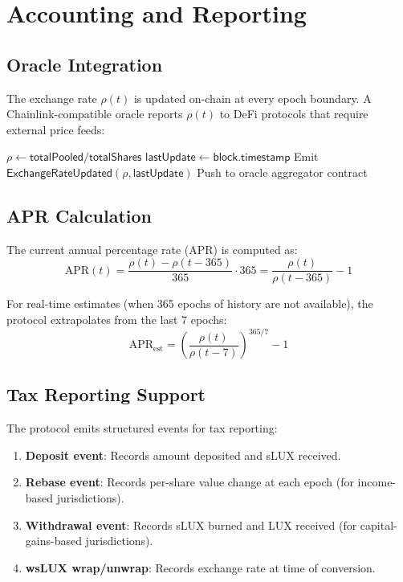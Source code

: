 \section{Accounting and Reporting}
\label{sec:accounting}

\subsection{Oracle Integration}

The exchange rate $\rho(t)$ is updated on-chain at every epoch boundary. A Chainlink-compatible oracle reports $\rho(t)$ to DeFi protocols that require external price feeds:

\begin{algorithm}[H]
\caption{Exchange Rate Oracle Update}
\label{alg:oracle}
\begin{algorithmic}[1]
    \State $\rho \gets \mathsf{totalPooled} / \mathsf{totalShares}$
    \State $\mathsf{lastUpdate} \gets \mathsf{block.timestamp}$
    \State Emit $\mathsf{ExchangeRateUpdated}(\rho, \mathsf{lastUpdate})$
    \State Push to oracle aggregator contract
\EndProcedure
\end{algorithmic}
\end{algorithm}

\subsection{APR Calculation}

The current annual percentage rate (APR) is computed as:
\begin{equation}
    \text{APR}(t) = \frac{\rho(t) - \rho(t - 365)}{365} \cdot 365 = \frac{\rho(t)}{\rho(t-365)} - 1
\end{equation}

For real-time estimates (when 365 epochs of history are not available), the protocol extrapolates from the last 7 epochs:
\begin{equation}
    \text{APR}_{\text{est}} = \left(\frac{\rho(t)}{\rho(t - 7)}\right)^{365/7} - 1
\end{equation}

\subsection{Tax Reporting Support}

The protocol emits structured events for tax reporting:

\begin{enumerate}
    \item \textbf{Deposit event}: Records amount deposited and sLUX received.
    \item \textbf{Rebase event}: Records per-share value change at each epoch (for income-based jurisdictions).
    \item \textbf{Withdrawal event}: Records sLUX burned and LUX received (for capital-gains-based jurisdictions).
    \item \textbf{wsLUX wrap/unwrap}: Records exchange rate at time of conversion.
\end{enumerate}

